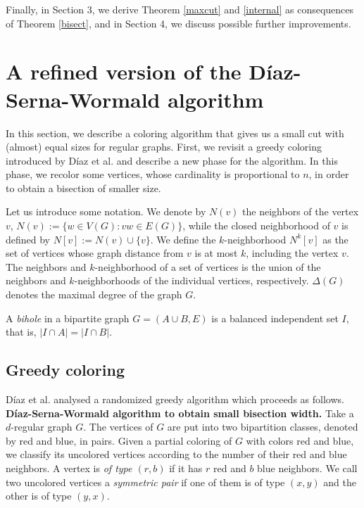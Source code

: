 \documentclass{article}
\theoremstyle{definition}
\begin{document}
 Finally, in Section 3, we derive Theorem \ref{maxcut} and \ref{internal} as consequences of Theorem \ref{bisect}, and in Section 4, we discuss possible further improvements.

\section{A refined version of the Díaz-Serna-Wormald algorithm}

 In this section, we describe a coloring algorithm that gives us a small cut with (almost) equal sizes for regular graphs. First, we revisit a greedy coloring introduced by Díaz et al. \cite{diaz2007bounds} and describe a new phase for the algorithm. In this phase, we recolor some vertices, whose cardinality is proportional to $n$, in order to obtain a bisection of smaller size. 

Let us introduce some notation. We denote by $N(v)$ the neighbors of the vertex $v$, $N(v):=\{w\in V(G): vw\in E(G)\}$, while the closed neighborhood of $v$ is defined by $N[v]:=N(v)\cup\{v\}$. We define the $k$-neighborhood $N^k[v]$ as the set of vertices whose graph distance from $v$ is at most $k$, including the vertex $v$. The neighbors and $k$-neighborhood of a set of vertices is the union of the neighbors and $k$-neighborhoods of the individual vertices, respectively. $\Delta(G)$ denotes the maximal degree of the graph $G$.

 A \textit{bihole} in a bipartite graph $G=(A\cup B, E)$ is a balanced independent set $I$, that is, $|I\cap A|=|I\cap B|$.

\subsection{Greedy coloring}\label{subsec:greedy}

 Díaz et al. \cite{diaz2007bounds} analysed a randomized greedy algorithm which proceeds as follows.\\

 \noindent \textbf{Díaz-Serna-Wormald algorithm to obtain small bisection width.}
Take a $d$-regular graph $G$.
The vertices of $G$ are put into two bipartition classes, denoted by red and blue, in pairs.
Given a partial coloring of $G$ with colors red and blue, we classify its uncolored vertices according to the number of their red and blue neighbors. A vertex is \textit{of type $(r,b)$} if it has $r$ red and $b$ blue neighbors. We call two uncolored vertices a \emph{symmetric pair} if one of them is of type $(x,y)$ and the other is of type $(y,x)$.
\end{document}
